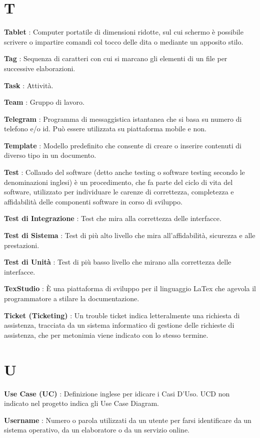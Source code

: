 \documentclass[12pt,a4paper,titlepage]{article}
\begin{document}
\section{T}
\begin{trivlist}
\item \textbf{Tablet} : Computer portatile di dimensioni ridotte, sul cui schermo è possibile scrivere o impartire comandi col tocco delle dita o mediante un apposito stilo.
\item \textbf{Tag} : Sequenza di caratteri con cui si marcano gli elementi di un file per successive elaborazioni.
\item \textbf{Task} : Attività.
\item \textbf{Team} : Gruppo di lavoro.
\item \textbf{Telegram} : Programma di messaggistica istantanea che si basa su numero di telefono e/o id. Può essere utilizzata su piattaforma mobile e non. 
\item \textbf{Template} : Modello predefinito che consente di creare o inserire contenuti di diverso tipo in un documento.
\item \textbf{Test} : Collaudo del software (detto anche testing o software testing secondo le denominazioni inglesi) è un procedimento, che fa parte del ciclo di vita del software, utilizzato per individuare le carenze di correttezza, completezza e affidabilità delle componenti software in corso di sviluppo.
\item \textbf{Test di Integrazione} : Test che mira alla correttezza delle interfacce.
\item \textbf{Test di Sistema} : Test di più alto livello che mira all'affidabilità, sicurezza e alle prestazioni.
\item \textbf{Test di Unità} : Test di più basso livello che mirano alla correttezza delle interfacce.
\item \textbf{TexStudio} : È una piattaforma di sviluppo per il linguaggio LaTex che agevola il programmatore a stilare la documentazione.
\item \textbf{Ticket (Ticketing)} : Un trouble ticket indica letteralmente una richiesta di assistenza, tracciata da un sistema informatico di gestione delle richieste di assistenza, che per metonimia viene indicato con lo stesso termine.
\end{trivlist}

\section{U}
\begin{trivlist}
\item \textbf{Use Case (UC)} : Definizione inglese per idicare i Casi D'Uso. UCD non indicato nel progetto indica gli Use Case Diagram.
\item \textbf{Username} : Numero o parola utilizzati da un utente per farsi identificare da un sistema operativo, da un elaboratore o da un servizio online.
\end{trivlist}
\end{document}
